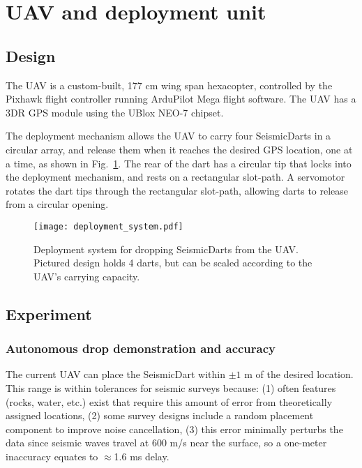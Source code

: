 \section{UAV and deployment unit}\label{sec:DeploymentUnit(UAV)}

\subsection{Design}
The UAV is a custom-built, 177 cm wing span hexacopter, controlled by the Pixhawk flight controller running ArduPilot Mega flight software. The UAV has a 3DR GPS module using the UBlox NEO-7 chipset.


 The deployment mechanism allows the UAV to carry four SeismicDarts in a circular array, and release them when it reaches the desired GPS location, one at a time, as shown in Fig.~\ref{fig:deployment_system}.
 The rear of the dart has a circular tip that locks into the deployment mechanism, and rests on a rectangular slot-path. 
 A servomotor rotates the dart tips through the rectangular slot-path, allowing darts to release from a circular opening.



\begin{figure} \centering
  {\texttt{[image: deployment\_system.pdf]}}
 \caption{Deployment system for dropping SeismicDarts from the UAV. Pictured design holds 4 darts, but can be scaled according to the UAV's carrying capacity.} 
 \label{fig:deployment_system}
\end{figure}



\subsection{Experiment}


\subsubsection{Autonomous drop demonstration and accuracy}

The current UAV can place the SeismicDart within $\pm1$ m of the desired location.  
This range is within tolerances for seismic surveys because:
(1) often features (rocks, water, etc.) exist that require this amount of error from theoretically assigned locations,
(2) some survey designs include a random placement component to improve noise cancellation,
(3) this error minimally perturbs the data since seismic waves travel at 600 m/s near the surface, so a one-meter inaccuracy equates to $\approx$1.6 ms delay.


